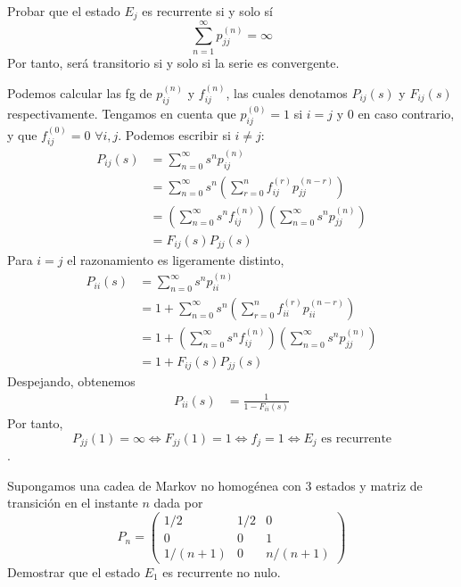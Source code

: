 \documentclass[twoside]{article}
\begin{document}
\begin{ejercicio}{5} Probar que el estado $E_j$ es recurrente si y solo sí 
$$
\sum_{n = 1}^\infty p_{jj}^{(n)} = \infty
$$
Por tanto, será transitorio si y solo si la serie es convergente.
\end{ejercicio}

\begin{solucion}
Podemos calcular las fg de $p_{ij}^{(n)}$ y $f_{ij}^{(n)}$, las cuales denotamos $P_{ij}(s)$ y $F_{ij}(s)$ respectivamente. Tengamos en cuenta que $p_{ij}^{(0)}=1$ si $i=j$ y $0$ en caso contrario, y que $f_{ij}^{(0)} = 0$ $\forall i,j$. Podemos escribir si $i\neq j$:
\begin{align*}
P_{ij}(s) &= \sum_{n=0}^\infty s^n p_{ij}^{(n)}\\
&= \sum_{n=0}^\infty s^n \left(\sum_{r=0}^{n}f_{ij}^{(r)}p_{jj}^{(n-r)}\right)\\
&=  \left(\sum_{n=0}^\infty s^n f_{ij}^{(n)}\right)\left( \sum_{n=0}^\infty s^n p_{jj}^{(n)}\right)\\
&=  F_{ij}(s)P_{jj}(s)
\end{align*}
Para $i=j$ el razonamiento es ligeramente distinto,
\begin{align*}
P_{ii}(s) &= \sum_{n=0}^\infty s^n p_{ii}^{(n)}\\
&= 1+\sum_{n=0}^\infty s^n \left(\sum_{r=0}^{n}f_{ii}^{(r)}p_{ii}^{(n-r)}\right)\\
&= 1+ \left(\sum_{n=0}^\infty s^n f_{ij}^{(n)}\right)\left( \sum_{n=0}^\infty s^n p_{jj}^{(n)}\right)\\
&=  1 + F_{ij}(s)P_{jj}(s)
\end{align*}
Despejando, obtenemos
\begin{align*}
P_{ii}(s) &= \frac{1}{1-F_{ii}(s)} 
\end{align*}
Por tanto, $$P_{jj}(1)=\infty \Leftrightarrow  F_{jj}(1)=1 \Leftrightarrow f_j = 1 \Leftrightarrow \text{$E_j$ es recurrente}$$ .
\end{solucion}
\newpage


\begin{ejercicio}{7}Supongamos una cadea de Markov no homogénea con $3$ estados y matriz de transición en el instante $n$ dada por
$$
P_n=
\begin{pmatrix}
1/2 & 1/2 & 0\\
0 & 0 & 1\\
1/(n+1) & 0 & n/(n+1)
\end{pmatrix}
$$
Demostrar que el estado $E_1$ es recurrente no nulo.
\end{ejercicio}
\end{document}
